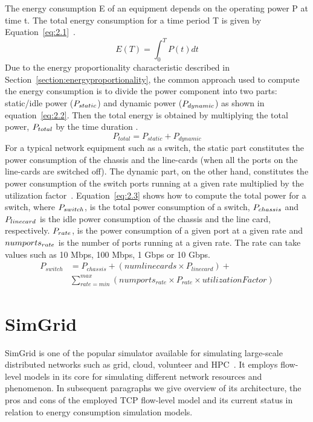 The energy consumption E of an equipment depends on the operating power P at time t. The total energy consumption for a time period T is given by Equation~\ref{eq:2.1}~\cite{DBLP:conf/wowmom/OrgerieLLL11}. 
\begin{equation} \label{eq:2.1}
  E(T) = \int_{0}^{T} P(t) dt
\end{equation} 
Due to the energy proportionality characteristic described in Section~\ref{section:energyproportionality}, the common approach used to compute the energy consumption is to divide the power component into two parts: static/idle power (\($$P_{static}$$\)) and dynamic power (\($$P_{dynamic}$$\)) as shown in equation~\ref{eq:2.2}. Then the total energy is obtained by multiplying the total power, \($$P_{total}$$\) by the time duration \cite{DBLP:conf/wowmom/OrgerieLLL11,DBLP:journals/tjs/KliazovichBK12,DBLP:conf/networking/MahadevanSBR09,DBLP:journals/comsur/DayarathnaWF16}. 
\begin{equation} \label{eq:2.2}
 P_{total} = P_{static} + P_{dynamic}
\end{equation} 
For a typical network equipment such as a switch, the static part constitutes the power consumption of the chassis and the line-cards (when all the ports on the line-cards are switched off). The dynamic part, on the other hand, constitutes the power consumption of the switch ports running at a given rate multiplied by the utilization factor~\cite{DBLP:conf/networking/MahadevanSBR09}. Equation~\ref{eq:2.3} shows how to compute the total power for a switch, where \($$P_{switch}$$\), is the total power consumption of a switch, \($$P_{chassis}$$\) and \($$P_{linecard}$$\) is the idle power consumption of the chassis and the line card, respectively. \($$P_{rate}$$\), is the power consumption of a given port at a given rate and \($$numports_{rate}$$\) is the number of ports running at a given rate. The rate can take values such as 10 Mbps, 100 Mbps, 1 Gbps or 10 Gbps.
\begin{equation} \label{eq:2.3}
\begin{split}
P_{switch} &= P_{chassis} + (numlinecards \times P_{linecard})  + \\
&\sum_{rate=min}^{max} (numports_{rate} \times P_{rate} \times utilizationFactor)
\end{split}
\end{equation}
\section{SimGrid}
\label{section:simgrid} 
SimGrid is one of the popular simulator available for simulating large-scale distributed networks such as grid, cloud, volunteer and HPC~\cite{simgrid}. It employs flow-level models in its core for simulating different network resources and phenomenon. In subsequent paragraphs we give overview of its architecture, the pros and cons of the employed TCP flow-level model and its current status in relation to energy consumption simulation models.

